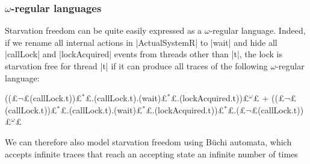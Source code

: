 \subsubsection{$\omega$-regular languages}


Starvation freedom can be quite easily expressed as a $\omega$-regular language. Indeed, if we rename all internal actions in |ActualSystemR| to |wait| and hide all |callLock| and |lockAcquired| events from threads other than |t|, the lock is starvation free for thread |t| if it can produce all traces of the following $\omega$-regular language:
\begin{cspm}
  ((£$\neg$£(callLock.t))£$^{*}$£.(callLock.t).(wait)£$^{*}$£.(lockAcquired.t))£$^{\omega}$£ + 
  ((£$\neg$£(callLock.t))£$^{*}$£.(callLock.t).(wait)£$^{*}$£.(lockAcquired.t))£$^{*}$£.(£$\neg$£(callLock.t))£$^{\omega}$£
\end{cspm}

We can therefore also model starvation freedom using B{\"u}chi automata, which accepts infinite traces that reach an accepting state an infinite number of times









